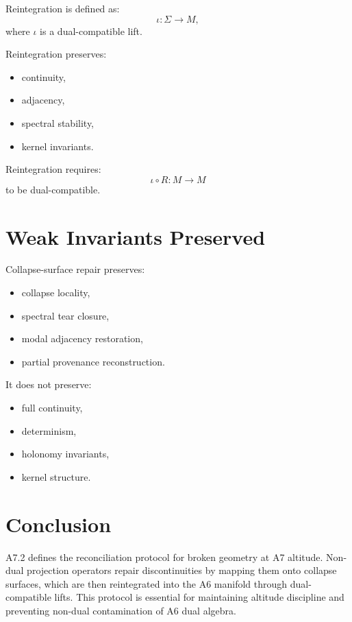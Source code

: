 \documentclass[11pt]{article}
\begin{document}
Reintegration is defined as:
\[
\iota : \Sigma \to M,
\]
where $\iota$ is a dual-compatible lift.

Reintegration preserves:
\begin{itemize}
  \item continuity,
  \item adjacency,
  \item spectral stability,
  \item kernel invariants.
\end{itemize}

Reintegration requires:
\[
\iota \circ R : M \to M
\]
to be dual-compatible.

\section{Weak Invariants Preserved}

Collapse-surface repair preserves:
\begin{itemize}
  \item collapse locality,
  \item spectral tear closure,
  \item modal adjacency restoration,
  \item partial provenance reconstruction.
\end{itemize}

It does not preserve:
\begin{itemize}
  \item full continuity,
  \item determinism,
  \item holonomy invariants,
  \item kernel structure.
\end{itemize}

\section{Conclusion}

A7.2 defines the reconciliation protocol for broken geometry at A7 altitude.
Non-dual projection operators repair discontinuities by mapping them onto
collapse surfaces, which are then reintegrated into the A6 manifold through
dual-compatible lifts. This protocol is essential for maintaining altitude
discipline and preventing non-dual contamination of A6 dual algebra.
\end{document}
